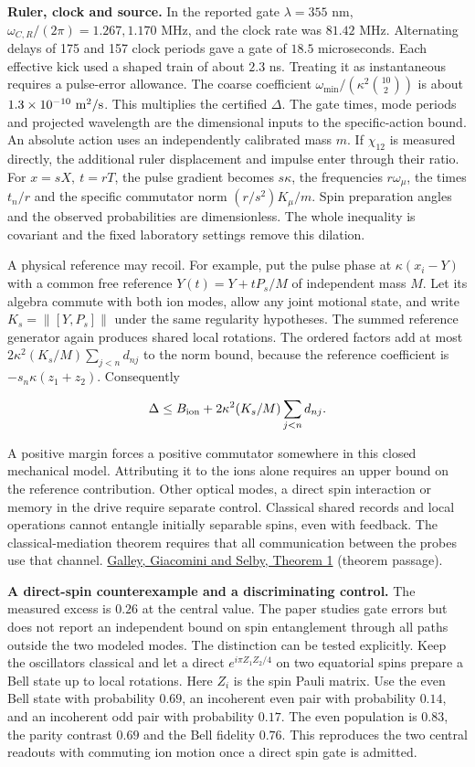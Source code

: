 \documentclass[11pt,a4paper]{article}
\begin{document}
\textbf{Ruler, clock and source.} In the reported gate \(\lambda=355\)
nm, \(\omega_{C,R}/(2\pi)=1.267,1.170\) MHz, and the clock rate was
\(81.42\) MHz. Alternating delays of 175 and 157 clock periods gave a
gate of \(18.5\) microseconds. Each effective kick used a shaped train
of about \(2.3\) ns. Treating it as instantaneous requires a pulse-error
allowance. The coarse coefficient
\(\omega_{\min}/(\kappa^2\binom{10}{2})\) is about
\(1.3\times10^{-10}\ {\rm m}^2/{\rm s}\). This multiplies the certified
\(\Delta\). The gate times, mode periods and projected wavelength are
the dimensional inputs to the specific-action bound. An absolute action
uses an independently calibrated mass \(m\). If \(\chi_{12}\) is
measured directly, the additional ruler displacement and impulse enter
through their ratio. For \(x=sX,\ t=rT\), the pulse gradient becomes
\(s\kappa\), the frequencies \(r\omega_\mu\), the times \(t_n/r\) and
the specific commutator norm \((r/s^2)K_\mu/m\). Spin preparation angles
and the observed probabilities are dimensionless. The whole inequality
is covariant and the fixed laboratory settings remove this dilation.

A physical reference may recoil. For example, put the pulse phase at
\(\kappa(x_i-Y)\) with a common free reference \(Y(t)=Y+tP_s/M\) of
independent mass \(M\). Let its algebra commute with both ion modes,
allow any joint motional state, and write \(K_s=\|[Y,P_s]\|\) under the
same regularity hypotheses. The summed reference generator again
produces shared local rotations. The ordered factors add at most
\(2\kappa^2(K_s/M)\sum_{j<n}d_{nj}\) to the norm bound, because the
reference coefficient is \(-s_n\kappa(z_1+z_2)\). Consequently

\[
\Delta\le B_{\rm ion}+2\kappa^2(K_s/M)\sum_{j<n}d_{nj}.
\]

A positive margin forces a positive commutator somewhere in this closed
mechanical model. Attributing it to the ions alone requires an upper
bound on the reference contribution. Other optical modes, a direct spin
interaction or memory in the drive require separate control. Classical
shared records and local operations cannot entangle initially separable
spins, even with feedback. The classical-mediation theorem requires that
all communication between the probes use that channel.
\href{https://quantum-journal.org/papers/q-2022-08-17-779/}{Galley,
Giacomini and Selby, Theorem 1} (theorem passage).

\textbf{A direct-spin counterexample and a discriminating control.} The
measured excess is \(0.26\) at the central value. The paper studies gate
errors but does not report an independent bound on spin entanglement
through all paths outside the two modeled modes. The distinction can be
tested explicitly. Keep the oscillators classical and let a direct
\(e^{i\pi Z_1 Z_2/4}\) on two equatorial spins prepare a Bell state up
to local rotations. Here \(Z_i\) is the spin Pauli matrix. Use the even
Bell state with probability \(0.69\), an incoherent even pair with
probability \(0.14\), and an incoherent odd pair with probability
\(0.17\). The even population is \(0.83\), the parity contrast \(0.69\)
and the Bell fidelity \(0.76\). This reproduces the two central readouts
with commuting ion motion once a direct spin gate is admitted.
\end{document}
